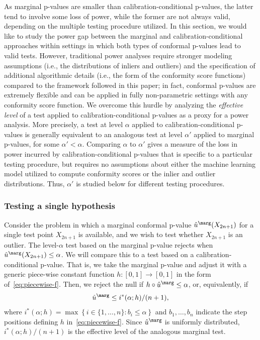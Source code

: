 As marginal p-values are smaller than calibration-conditional p-values, the latter tend to involve some loss of power, while the former are not always valid, depending on the multiple testing procedure utilized.
In this section, we would like to study the power gap between the marginal and calibration-conditional approaches within settings in which both types of conformal p-values lead to valid tests.
However, traditional power analyses require stronger modeling assumptions (i.e., the distributions of inliers and outliers) and the specification of additional algorithmic details (i.e., the form of the conformity score functions) compared to the framework followed in this paper; in fact, conformal p-values are extremely flexible and can be applied in fully non-parametric settings with any conformity score function.
We overcome this hurdle by analyzing the {\em effective level} of a test applied to calibration-conditional p-values as a proxy for a power analysis.
More precisely, a test at level $\alpha$ applied to calibration-conditional p-values is generally equivalent to an analogous test at level $\alpha'$ applied to marginal p-values, for some $\alpha' < \alpha$.
Comparing $\alpha$ to $\alpha'$ gives a measure of the loss in power incurred by calibration-conditional p-values that is specific to a particular testing procedure, but requires no assumptions about either the machine learning model utilized to compute conformity scores or the inlier and outlier distributions.
Thus, $\alpha'$ is studied below for different testing procedures.

\subsubsection{Testing a single hypothesis} \label{sec:power-single}

Consider the problem in which a marginal conformal p-value $\hat{u}^\marg(X_{2n+1})$ for a single test point $X_{2n+1}$ is available, and we wish to test whether $X_{2n+1}$ is an outlier. The level-$\alpha$ test based on the marginal p-value rejects when $\hat{u}^\marg(X_{2n+1}) \le \alpha$. We will compare this to a test based on a calibration-conditional p-value. That is, we take the marginal p-value and adjust it with a generic piece-wise constant function $h : [0,1] \to [0,1]$ in the form of~\eqref{eq:piecewise-f}. Then, we reject the null if $h \circ \hat{u}^\marg \leq \alpha$, or, equivalently, if
\begin{equation*}
  \hat{u}^\marg \leq {i^*(\alpha; h)}/{(n+1)},
\end{equation*}
where $i^*(\alpha; h) = \max \left\{ i \in \{1,\ldots,n\} : b_i \leq \alpha \right\}$ and $b_1, \ldots, b_n$ indicate the step positions defining $h$ in~\eqref{eq:piecewise-f}.
Since $\hat{u}^\marg$ is uniformly distributed, $i^{*}(\alpha; h) / (n + 1)$ is the effective level of the analogous marginal test.


